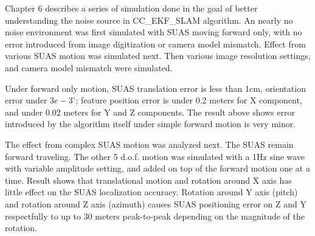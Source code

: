 Chapter 6 describes a series of simulation done in the goal of
better understanding the noise source in CC\_EKF\_SLAM algorithm. An
nearly no noise environment was first simulated with SUAS moving
forward only, with no error introduced from image digitization or
camera model mismatch. Effect from various SUAS motion was simulated
next. Then various image resolution settings, and camera model mismatch were
simulated. 

Under forward only motion, SUAS translation error is less than 1cm,
orientation error under $3e-3^\circ$; feature position error is under
0.2 meters for X component, and under 0.02 meters for Y and Z
components. The result above shows error introduced by the algorithm
itself under simple forward motion is very minor.

The effect from complex SUAS motion was analyzed next. The SUAS remain
forward traveling. The other 5 d.o.f. motion was simulated with a 1Hz
sine wave with variable amplitude setting, and added on top of the
forward motion one at a time. Result shows that translational motion
and rotation around X axis has little effect on the SUAS localization
accuracy. Rotation around Y axis (pitch) and rotation around Z axis
(azimuth) causes SUAS positioning error on Z and Y respectfully to up to
30 meters peak-to-peak depending on the magnitude of the rotation. 
